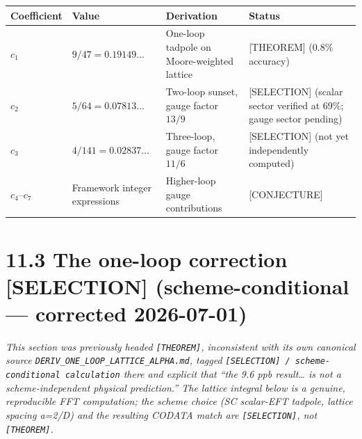 \documentclass[
  11pt,
  letterpaper,
  twoside,
  openright]{book}
\begin{document}
\begin{longtable}[]{@{}
  >{\raggedright\arraybackslash}p{}
  >{\raggedright\arraybackslash}p{}
  >{\raggedright\arraybackslash}p{}
  >{\raggedright\arraybackslash}p{}@{}}
\toprule\noalign{}
\begin{minipage}[b]{\linewidth}\raggedright
Coefficient
\end{minipage} & \begin{minipage}[b]{\linewidth}\raggedright
Value
\end{minipage} & \begin{minipage}[b]{\linewidth}\raggedright
Derivation
\end{minipage} & \begin{minipage}[b]{\linewidth}\raggedright
Status
\end{minipage} \\
\midrule\noalign{}
\endhead
\bottomrule\noalign{}
\endlastfoot
\(c_1\) & \(9/47 = 0.19149\ldots\) & One-loop tadpole on Moore-weighted
lattice & {[}THEOREM{]} (0.8\% accuracy) \\
\(c_2\) & \(5/64 = 0.07813\ldots\) & Two-loop sunset, gauge factor
\(13/9\) & {[}SELECTION{]} (scalar sector verified at 69\%; gauge sector
pending) \\
\(c_3\) & \(4/141 = 0.02837\ldots\) & Three-loop, gauge factor \(11/6\)
& {[}SELECTION{]} (not yet independently computed) \\
\(c_4\)--\(c_7\) & Framework integer expressions & Higher-loop gauge
contributions & {[}CONJECTURE{]} \\
\end{longtable}

\section{11.3 The one-loop correction {[}SELECTION{]}
(scheme-conditional --- corrected
2026-07-01)}\label{the-one-loop-correction-selection-scheme-conditional-corrected-2026-07-01}

\emph{This section was previously headed \texttt{{[}THEOREM{]}},
inconsistent with its own canonical source
\texttt{DERIV\_ONE\_LOOP\_LATTICE\_ALPHA.md}, tagged
\texttt{{[}SELECTION{]}\ /\ scheme-conditional\ calculation} there and
explicit that ``the 9.6 ppb result\ldots{} is not a scheme-independent
physical prediction.'' The lattice integral below is a genuine,
reproducible FFT computation; the scheme choice (SC scalar-EFT tadpole,
lattice spacing a=2/D) and the resulting CODATA match are
\texttt{{[}SELECTION{]}}, not \texttt{{[}THEOREM{]}}.}
\end{document}
